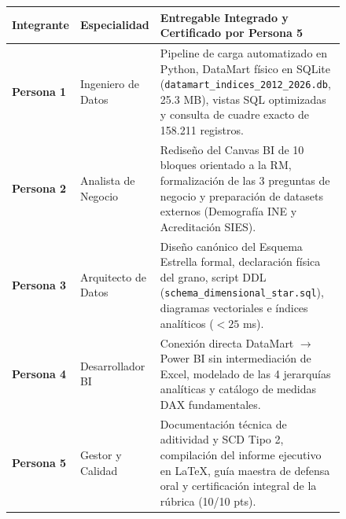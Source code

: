 \documentclass[11pt,a4paper]{article}
\begin{document}
\begin{figure}[h!]
\centering
\begin{tabularx}{\textwidth}{p{2.6cm}p{3.2cm}X}
\toprule
\textbf{Integrante} & \textbf{Especialidad} & \textbf{Entregable Integrado y Certificado por Persona 5} \\
\midrule
\textbf{Persona 1} & Ingeniero de Datos & Pipeline de carga automatizado en Python, DataMart físico en SQLite (\texttt{datamart\_indices\_2012\_2026.db}, 25.3 MB), vistas SQL optimizadas y consulta de cuadre exacto de 158.211 registros. \\
\addlinespace
\textbf{Persona 2} & Analista de Negocio & Rediseño del Canvas BI de 10 bloques orientado a la RM, formalización de las 3 preguntas de negocio y preparación de datasets externos (Demografía INE y Acreditación SIES). \\
\addlinespace
\textbf{Persona 3} & Arquitecto de Datos & Diseño canónico del Esquema Estrella formal, declaración física del grano, script DDL (\texttt{schema\_dimensional\_star.sql}), diagramas vectoriales e índices analíticos ($< 25$ ms). \\
\addlinespace
\textbf{Persona 4} & Desarrollador BI & Conexión directa DataMart $\rightarrow$ Power BI sin intermediación de Excel, modelado de las 4 jerarquías analíticas y catálogo de medidas DAX fundamentales. \\
\addlinespace
\textbf{Persona 5} & Gestor y Calidad & Documentación técnica de aditividad y SCD Tipo 2, compilación del informe ejecutivo en \LaTeX, guía maestra de defensa oral y certificación integral de la rúbrica (10/10 pts). \\
\bottomrule
\end{tabularx}
\end{figure}
\end{document}
